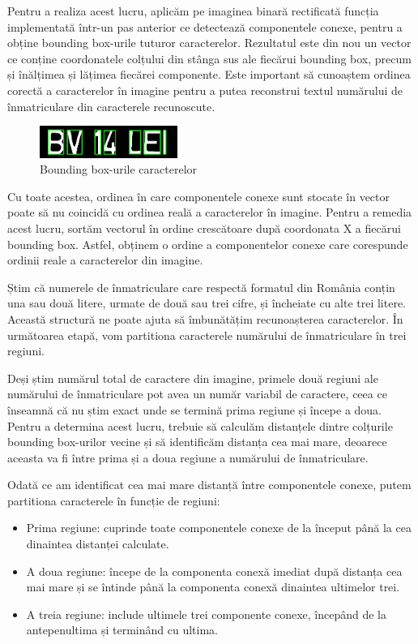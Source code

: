 \documentclass[a4paper,12pt]{report}
\begin{document}
Pentru a realiza acest lucru, aplicăm pe imaginea binară rectificată funcția implementată într-un pas anterior ce detectează componentele conexe, pentru a obține bounding box-urile tuturor caracterelor. Rezultatul este din nou un vector ce conține coordonatele colțului din stânga sus ale fiecărui bounding box, precum și înălțimea și lățimea fiecărei componente. Este important să cunoaștem ordinea corectă a caracterelor în imagine pentru a putea reconstrui textul numărului de înmatriculare din caracterele recunoscute.

\begin{figure}[h!]
    \centering
    \includegraphics[width=0.4\textwidth]{images/chars.jpg}
    \caption{Bounding box-urile caracterelor}
\end{figure}
\FloatBarrier

Cu toate acestea, ordinea în care componentele conexe sunt stocate în vector poate să nu coincidă cu ordinea reală a caracterelor în imagine. Pentru a remedia acest lucru, sortăm vectorul în ordine crescătoare după coordonata X a fiecărui bounding box. Astfel, obținem o ordine a componentelor conexe care corespunde ordinii reale a caracterelor din imagine.

Știm că numerele de înmatriculare care respectă formatul din România conțin una sau două litere, urmate de două sau trei cifre, și încheiate cu alte trei litere. Această structură ne poate ajuta să îmbunătățim recunoașterea caracterelor. În următoarea etapă, vom partitiona caracterele numărului de înmatriculare în trei regiuni.

Deși știm numărul total de caractere din imagine, primele două regiuni ale numărului de înmatriculare pot avea un număr variabil de caractere, ceea ce înseamnă că nu știm exact unde se termină prima regiune și începe a doua. Pentru a determina acest lucru, trebuie să calculăm distanțele dintre colțurile bounding box-urilor vecine și să identificăm distanța cea mai mare, deoarece aceasta va fi între prima și a doua regiune a numărului de înmatriculare.

Odată ce am identificat cea mai mare distanță între componentele conexe, putem partitiona caracterele în funcție de regiuni:
\begin{itemize}
    \item Prima regiune: cuprinde toate componentele conexe de la început până la cea dinaintea distanței calculate.
    \item A doua regiune: începe de la componenta conexă imediat după distanța cea mai mare și se întinde până la componenta conexă dinaintea ultimelor trei.
    \item A treia regiune: include ultimele trei componente conexe, începând de la antepenultima și terminând cu ultima.
\end{itemize}
\end{document}
